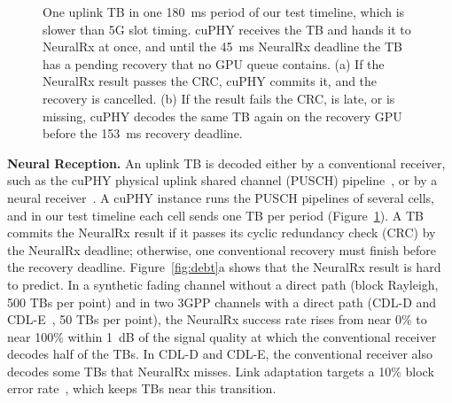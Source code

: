 \documentclass[acmsmall,screen,review,anonymous]{acmart}
\newcommand{\NRx}{NeuralRx\xspace}
\begin{document}
\begin{figure}[t]
  \centering
  
  \caption{One uplink TB in one 180~ms period of our test timeline, which is slower than 5G slot timing.
  cuPHY receives the TB and hands it to \NRx at once, and until the 45~ms \NRx deadline the TB has a
  pending recovery that no GPU queue contains. (a) If the \NRx result passes the CRC, cuPHY commits it,
  and the recovery is cancelled. (b) If the result fails the CRC, is late, or is missing, cuPHY decodes
  the same TB again on the recovery GPU before the 153~ms recovery deadline.}
  \label{fig:airan-background}
\end{figure}

\noindent\textbf{Neural Reception.}
An uplink TB is decoded either by a conventional receiver, such as the cuPHY physical uplink shared
channel (PUSCH) pipeline~\cite{aerial}, or by a neural receiver~\cite{deeprx,nrx5g}. A cuPHY instance runs
the PUSCH pipelines of several cells, and in our test timeline each cell sends one TB per period
(Figure~\ref{fig:airan-background}). A TB commits the \NRx result if it passes its cyclic redundancy check
(CRC) by the \NRx deadline; otherwise, one conventional recovery must finish before the recovery
deadline. Figure~\ref{fig:debt}a shows that the \NRx result is hard to predict. In a synthetic fading
channel without a direct path (block Rayleigh, 500 TBs per point) and in two 3GPP channels with a direct
path (CDL-D and CDL-E~\cite{tr38901,sionna}, 50 TBs per point), the \NRx success rate rises from near
0\% to near 100\% within 1~dB of the signal quality at which the conventional receiver decodes half of
the TBs. In CDL-D and CDL-E, the conventional receiver also decodes some TBs that \NRx misses. Link
adaptation targets a 10\% block error rate~\cite{ts38214}, which keeps TBs near this transition.
\end{document}
